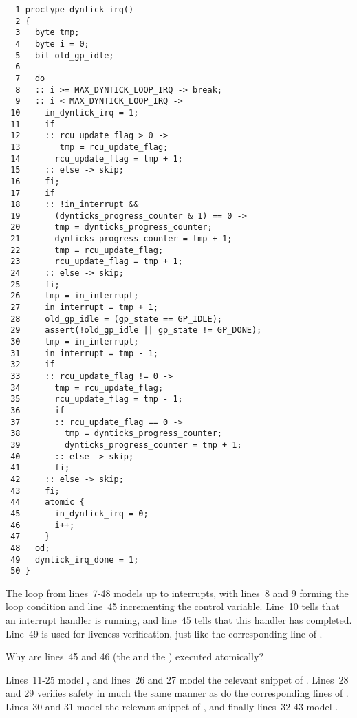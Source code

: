 { \scriptsize
\begin{verbatim}
  1 proctype dyntick_irq()
  2 {
  3   byte tmp;
  4   byte i = 0;
  5   bit old_gp_idle;
  6
  7   do
  8   :: i >= MAX_DYNTICK_LOOP_IRQ -> break;
  9   :: i < MAX_DYNTICK_LOOP_IRQ ->
 10     in_dyntick_irq = 1;
 11     if
 12     :: rcu_update_flag > 0 ->
 13        tmp = rcu_update_flag;
 14       rcu_update_flag = tmp + 1;
 15     :: else -> skip;
 16     fi;
 17     if
 18     :: !in_interrupt &&
 19       (dynticks_progress_counter & 1) == 0 ->
 20       tmp = dynticks_progress_counter;
 21       dynticks_progress_counter = tmp + 1;
 22       tmp = rcu_update_flag;
 23       rcu_update_flag = tmp + 1;
 24     :: else -> skip;
 25     fi;
 26     tmp = in_interrupt;
 27     in_interrupt = tmp + 1;
 28     old_gp_idle = (gp_state == GP_IDLE);
 29     assert(!old_gp_idle || gp_state != GP_DONE);
 30     tmp = in_interrupt;
 31     in_interrupt = tmp - 1;
 32     if
 33     :: rcu_update_flag != 0 ->
 34       tmp = rcu_update_flag;
 35       rcu_update_flag = tmp - 1;
 36       if
 37       :: rcu_update_flag == 0 ->
 38         tmp = dynticks_progress_counter;
 39         dynticks_progress_counter = tmp + 1;
 40       :: else -> skip;
 41       fi;
 42     :: else -> skip;
 43     fi;
 44     atomic {
 45       in_dyntick_irq = 0;
 46       i++;
 47     }
 48   od;
 49   dyntick_irq_done = 1;
 50 }
\end{verbatim}
}

The loop from lines~7-48 models up to 
interrupts, with lines~8 and 9 forming the loop condition and line~45
incrementing the control variable.
Line~10 tells  that an interrupt handler
is running, and line~45 tells  that this
handler has completed.
Line~49 is used for liveness verification, just like the corresponding
line of .

\QuickQuiz{}
	Why are lines~45 and 46 (the 
	and the ) executed atomically?
 \QuickQuizEnd

Lines~11-25 model , and
lines~26 and 27 model the relevant snippet of .
Lines~28 and 29 verifies safety in much the same manner as do the
corresponding lines of .
Lines~30 and 31 model the relevant snippet of ,
and finally lines~32-43 model .


